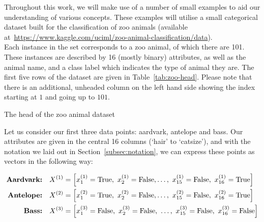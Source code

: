 \begin{example}\label{ex:dissim}
    Throughout this work, we will make use of a number of small examples to aid 
    our understanding of various concepts. These examples will utilise a small 
    categorical dataset built for the classification of zoo animals (available
    at~\url{https://www.kaggle.com/uciml/zoo-animal-classification/data}).\\

    Each instance in the set corresponds to a zoo animal, of which there are
    101. These instances are described by 16 (mostly binary) attributes, as well
    as the animal name, and a class label which indicates the type of animal 
    they are. The first five rows of the dataset are given in 
    Table~\ref{tab:zoo-head}. Please note that there is an additional, unheaded
    column on the left hand side showing the index starting at \(1\) and going 
    up to \(101\).\\
    
    \begin{table}[h]
    \resizebox{\textwidth}{!}{%
        \centering
        
    }
    \caption{The head of the zoo animal dataset}\label{tab:zoo-head}
    \end{table}

    Let us consider our first three data points: aardvark, antelope and bass. 
    Our attributes are given in the central 16 columns (`hair' to `catsize'), 
    and with the notation we laid out in Section~\ref{subsec:notation}, we can 
    express these points as vectors in the following way:

    \begin{equation}
    \nonumber
    \begin{aligned}
        \textbf{Aardvark:} \quad & X^{(1)} = \left[x_1^{(1)} = \true, \ 
            x_2^{(1)} = \false, \ldots, \ x_{15}^{(1)} = \false, \ x_{16}^{(1)} 
            = \true\right]
        \\
        \textbf{Antelope:} \quad & X^{(2)} = \left[x_1^{(2)} = \true, \
            x_2^{(2)} = \false, \ldots, \ x_{15}^{(2)} = \false, \ x_{16}^{(2)} 
            = \true\right]
        \\
        \textbf{Bass:} \quad & X^{(3)} = \left[x_1^{(3)} = \false, \ x_2^{(3)} = 
            \false, \ \ldots, \ x_{15}^{(3)} = \false, \ x_{16}^{(3)} = 
            \false\right]
        \\
    \end{aligned}
    \end{equation}


\end{example}
